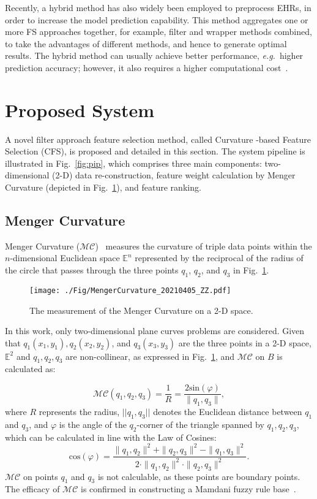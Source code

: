 \documentclass{article}
\newcommand{\zzeg}{\emph{e.g.}~}
\newcommand*{\1}{\textcolor{magenta}}
\begin{document}
	Recently, a hybrid method has also widely been employed to preprocess EHRs, in order to increase the model prediction capability. This method aggregates one or more FS approaches together, for example, filter and wrapper methods combined, to take the advantages of different methods, and hence to generate optimal results. The hybrid method can usually achieve better performance, \zzeg higher prediction accuracy; however, it also requires a higher computational cost~\cite{jain2018feature}. 
	
	\section{Proposed System} \label{sec:appr}
	A novel filter approach feature selection method, called Curvature -based Feature Selection (CFS), is proposed and detailed in this section. The system pipeline is illustrated in Fig.~\ref{fig:pip}, which comprises three main components: two-dimensional (2-D) data re-construction, feature weight calculation by Menger Curvature (depicted in Fig.~\ref{fig:mengercurvature}), and feature ranking. 
	
	\subsection{Menger Curvature}\label{sec:RoC}
	Menger Curvature ($\mathcal{MC}$)~\cite{leger1999menger} measures the curvature of triple data points within the $n$-dimensional Euclidean space $\mathbb{E}^n$ represented by the reciprocal of the radius of the circle that passes through the three points $q_1$, $q_2$, and $q_3$ in Fig.~\ref{fig:mengercurvature}.
	\begin{figure}[!ht]
		\centering
		\texttt{[image: ./Fig/MengerCurvature\_20210405\_ZZ.pdf]}
		\caption{The measurement of the Menger Curvature on a 2-D space.}
		\label{fig:mengercurvature}
	\end{figure}
	
	In this work, only two-dimensional plane curves problems are considered. Given that $q_1(x_1,y_1),q_2(x_2,y_2)$, and $q_3(x_3,y_3)$ are the three points in a 2-D space, $\mathbb{E}^2$ and $q_1,q_2,q_3$ are non-collinear, as expressed in Fig.~\ref{fig:mengercurvature}, and $\mathcal{MC}$ on $B$ is calculated as:
	
	\begin{equation}\label{eq:MCvalue}
		\mathcal{MC}	(q_1,q_2,q_3) = \frac{1}{R} = \frac{2\textrm{sin}(\varphi)}{\|q_1,q_3\|},
	\end{equation}
	where $R$ represents the radius, $||q_1,q_3||$ denotes the Euclidean distance between $q_1$ and $q_3$, and  $\varphi$ is the angle of the $q_2$-corner of the triangle spanned by $q_1,q_2,q_3$, which can be calculated in line with the Law of Cosines:
	\begin{equation}
		\textrm{cos}(\varphi) = \frac{\|q_1,q_2\|^2 + \|q_2,q_3\|^2 - \|q_1,q_3\|^2}{2\cdot\|q_1,q_2\|^2\cdot\|q_2,q_3\|^2}.
	\end{equation}
	$\mathcal{MC}$ on points $q_1$ and $q_3$ is not calculable, as these points are boundary points. The efficacy of $\mathcal{MC}$ is confirmed in constructing a Mamdani fuzzy rule base~\cite{zuo2020CSRBG}.
	
\end{document}
